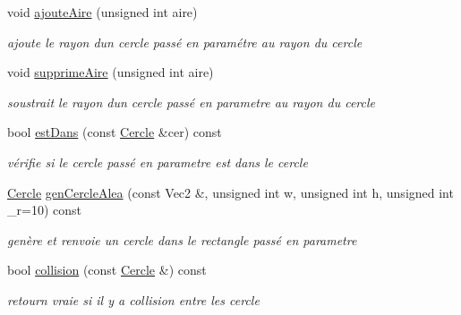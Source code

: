 \begin{DoxyCompactItemize}
\mbox{\label{class_cercle_a6516bebd675e3a7f56de8a93dc2ff670}} 
void \mbox{\hyperlink{class_cercle_a6516bebd675e3a7f56de8a93dc2ff670}{ajoute\+Aire}} (unsigned int aire)
\begin{DoxyCompactList}\small\item\em ajoute le rayon d\textquotesingle{}un cercle passé en paramétre au rayon du cercle ~\newline
 \end{DoxyCompactList}\item 
\mbox{\label{class_cercle_a7fac92d1564ceb7a212ccf9c1be57ea3}} 
void \mbox{\hyperlink{class_cercle_a7fac92d1564ceb7a212ccf9c1be57ea3}{supprime\+Aire}} (unsigned int aire)
\begin{DoxyCompactList}\small\item\em soustrait le rayon d\textquotesingle{}un cercle passé en parametre au rayon du cercle \end{DoxyCompactList}\item 
bool \mbox{\hyperlink{class_cercle_a256c98a53c132fddfb4fa23247ba4dde}{est\+Dans}} (const \mbox{\hyperlink{class_cercle}{Cercle}} \&cer) const
\begin{DoxyCompactList}\small\item\em vérifie si le cercle passé en parametre est dans le cercle \end{DoxyCompactList}\item 
\mbox{\label{class_cercle_a3a1e94b61db21ea60fe8d723f185adfe}} 
\mbox{\hyperlink{class_cercle}{Cercle}} \mbox{\hyperlink{class_cercle_a3a1e94b61db21ea60fe8d723f185adfe}{gen\+Cercle\+Alea}} (const Vec2 \&, unsigned int w, unsigned int h, unsigned int \+\_\+r=10) const
\begin{DoxyCompactList}\small\item\em genère et renvoie un cercle dans le rectangle passé en parametre \end{DoxyCompactList}\item 
\mbox{\label{class_cercle_afcc78712925d4dd41673ceaac4838f0c}} 
bool \mbox{\hyperlink{class_cercle_afcc78712925d4dd41673ceaac4838f0c}{collision}} (const \mbox{\hyperlink{class_cercle}{Cercle}} \&) const
\begin{DoxyCompactList}\small\item\em retourn vraie si il y a collision entre les cercle \end{DoxyCompactList}\item 

\end{DoxyCompactItemize}
